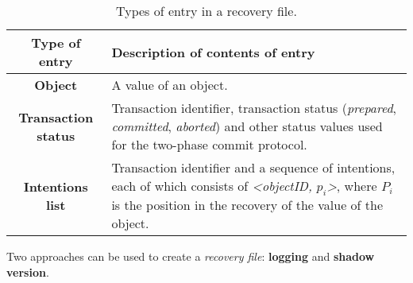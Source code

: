 \begin{table}[H]
	\centering
	\begin{tabular}{| c | p{11cm} |}
		\hline
		\textbf{Type of entry} & \textbf{Description of contents of entry} \\ \hline
		\textbf{Object} & A value of an object. \\
		\hline
		\textbf{Transaction status} & Transaction identifier, transaction status (\textit{prepared}, \textit{committed}, \textit{aborted}) and other status values used for the two-phase commit protocol. \\
		\hline
		\textbf{Intentions list} & Transaction identifier and a sequence of intentions, each of which consists of \textit{<objectID, $p_i$>}, where $P_i$ is the position in the recovery of the value of the object.\\
		\hline
	\end{tabular}
	\caption{Types of entry in a recovery file.}
\end{table}
Two approaches can be used to create a \textit{recovery file}: \textbf{logging} and \textbf{shadow version}.

